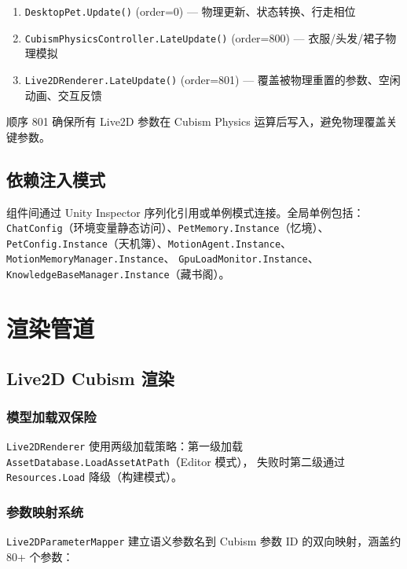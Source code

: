 \documentclass[12pt,a4paper]{ctexart}
\begin{document}
\begin{enumerate}
    \item \texttt{DesktopPet.Update()} (order=0) --- 物理更新、状态转换、行走相位
    \item \texttt{CubismPhysicsController.LateUpdate()} (order=800) --- 衣服/头发/裙子物理模拟
    \item \texttt{Live2DRenderer.LateUpdate()} (order=801) --- 覆盖被物理重置的参数、空闲动画、交互反馈
\end{enumerate}

顺序 801 确保所有 Live2D 参数在 Cubism Physics 运算后写入，避免物理覆盖关键参数。

\subsection{依赖注入模式}

组件间通过 Unity Inspector 序列化引用或单例模式连接。全局单例包括：
\texttt{ChatConfig}（环境变量静态访问）、\texttt{PetMemory.Instance}（忆境）、
\texttt{PetConfig.Instance}（天机簿）、\texttt{MotionAgent.Instance}、\texttt{MotionMemoryManager.Instance}、
\texttt{GpuLoadMonitor.Instance}、\texttt{KnowledgeBaseManager.Instance}（藏书阁）。

\section{渲染管道}

\subsection{Live2D Cubism 渲染}

\subsubsection{模型加载双保险}

\texttt{Live2DRenderer} 使用两级加载策略：第一级加载 \texttt{AssetDatabase.LoadAssetAtPath}（Editor 模式），
失败时第二级通过 \texttt{Resources.Load} 降级（构建模式）。

\subsubsection{参数映射系统}

\texttt{Live2DParameterMapper} 建立语义参数名到 Cubism 参数 ID 的双向映射，涵盖约 80+ 个参数：
\end{document}
